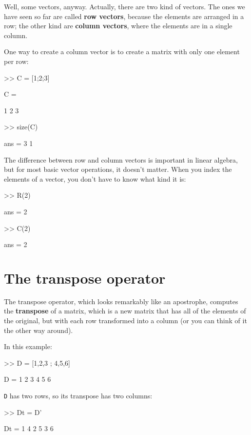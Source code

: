 \documentclass[
]{book}
\numberwithin{Answer}{chapter}
\numberwithin{Exercise}{chapter}
\begin{document}
Well, some vectors, anyway.  Actually, there are two kind
of vectors.  The ones we have seen so far are called {\bf row vectors},
because the elements are arranged in a row; the other kind are
{\bf column vectors}, where the elements are in a single column.

One way to create a column vector is to create a matrix with only
one element per row:

\begin{code}
>> C = [1;2;3]

C =

     1
     2
     3

>> size(C)

ans = 3     1
\end{code}

The difference between row and column vectors is important in
linear algebra, but for most basic vector operations, it doesn't matter.  When you index the elements of a vector, you don't have to know what kind
it is:

\begin{code}
>> R(2)

ans = 2

>> C(2)

ans = 2
\end{code}



\section{The transpose operator}

The transpose operator, which looks remarkably like an apostrophe,
computes the {\bf transpose} of a matrix, which is a new matrix
that has all of the elements of the original, but with each row
transformed into a column (or you can think of it the other way around).

In this example:

\begin{code}
>> D = [1,2,3 ; 4,5,6]

D =  1     2     3
     4     5     6
\end{code}

{\tt D} has two rows, so its transpose has two columns:

\begin{code}
>> Dt = D'

Dt = 1     4
     2     5
     3     6
\end{code}
\end{document}
